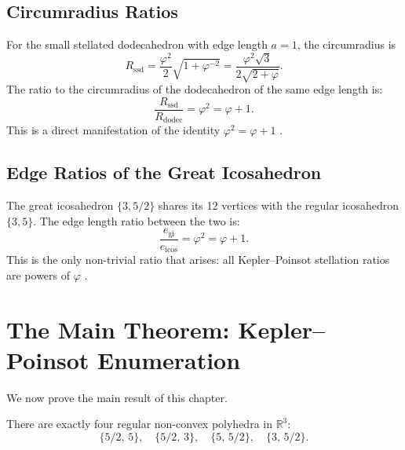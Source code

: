 \subsection{Circumradius Ratios}
\label{ssec:circumradius-ratios}

For the small stellated dodecahedron with edge length $a=1$,
the circumradius is
\[
  R_{\mathrm{ssd}} = \frac{\varphi^2}{2}\sqrt{1+\varphi^{-2}} = \frac{\varphi^2\sqrt{3}}{2\sqrt{2+\varphi}}.
\]
The ratio to the circumradius of the dodecahedron of the same
edge length is:
\[
  \frac{R_{\mathrm{ssd}}}{R_{\mathrm{dodec}}} = \varphi^2 = \varphi + 1.
\]
This is a direct manifestation of the identity $\varphi^2 = \varphi + 1$
\cite{Coxeter1973Regular, Cromwell1997}.

\subsection{Edge Ratios of the Great Icosahedron}
\label{ssec:great-icos-edge}

The great icosahedron \(\{3, 5/2\}\) shares its 12 vertices
with the regular icosahedron \(\{3,5\}\).  The edge length
ratio between the two is:
\[
  \frac{e_{\mathrm{gi}}}{e_{\mathrm{icos}}} = \varphi^2 = \varphi+1.
\]
This is the only non-trivial ratio that arises: all
Kepler–Poinsot stellation ratios are powers of \(\varphi\)
\cite{coxeter_fifty_nine_icosahedra}.

\section{The Main Theorem: Kepler--Poinsot Enumeration}
\label{sec:enumeration-theorem}

We now prove the main result of this chapter.

\begin{theorem}
\label{thm:kepler-poinsot-enumeration}
There are exactly four regular non-convex polyhedra in
$\mathbb{R}^3$:
\[
  \{5/2,\,5\},\quad \{5/2,\,3\},\quad \{5,\,5/2\},\quad \{3,\,5/2\}.
\]
\end{theorem}

